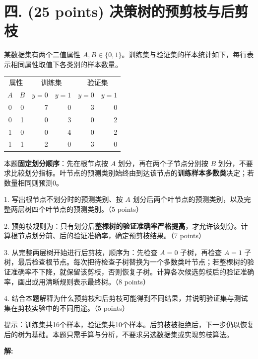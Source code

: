\documentclass[8pt]{article}
\begin{document}
\section*{四. (25 points) 决策树的预剪枝与后剪枝}
某数据集有两个二值属性 $A,B\in\{0,1\}$。训练集与验证集的样本统计如下，每行表示相同属性取值下各类别的样本数量。
\begin{center}
\begin{tabular}{ccrrrr}
\toprule
\multicolumn{2}{c}{属性} & \multicolumn{2}{c}{训练集} & \multicolumn{2}{c}{验证集} \\
$A$ & $B$ & $y=0$ & $y=1$ & $y=0$ & $y=1$ \\
\midrule
0 & 0 & 7 & 0 & 3 & 0 \\
0 & 1 & 0 & 3 & 0 & 2 \\
1 & 0 & 0 & 4 & 0 & 2 \\
1 & 1 & 2 & 0 & 3 & 0 \\
\bottomrule
\end{tabular}
\end{center}
本题\textbf{固定划分顺序}：先在根节点按 $A$ 划分，再在两个子节点分别按 $B$ 划分，不要求比较划分指标。叶节点的预测类别始终由到达该节点的\textbf{训练样本多数类}决定；若数量相同则预测0。

1. 写出根节点不划分时的预测类别、按 $A$ 划分后两个叶节点的预测类别，以及完整两层树四个叶节点的预测类别。（5 points）

2. 预剪枝规则为：只有划分后\textbf{整棵树的验证准确率严格提高}，才允许该划分。计算根节点划分前、后的验证准确率，确定预剪枝结果。（7 points）

3. 从完整两层树开始进行后剪枝，顺序为：先检查 $A=0$ 子树，再检查 $A=1$ 子树，最后检查根节点。每次把待检查子树替换为一个多数类叶节点；若整棵树的验证准确率不下降，就保留该剪枝，否则恢复子树。计算各次候选剪枝后的验证准确率，画出或用清晰规则表示最终树。（8 points）

4. 结合本题解释为什么预剪枝和后剪枝可能得到不同结果，并说明验证集与测试集在剪枝实验中的不同用途。（5 points）

\noindent 提示：训练集共16个样本，验证集共10个样本。后剪枝被拒绝后，下一步仍以恢复后的树为基础。本题只需手算与分析，不要求另选数据集或实现剪枝算法。

\textbf{\large 解:}
\end{document}
